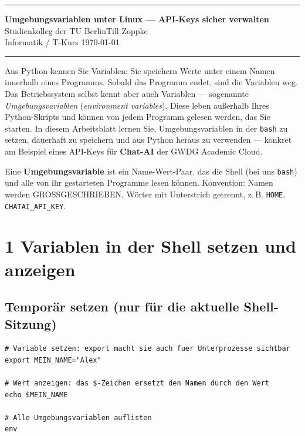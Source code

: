 \documentclass[ngerman,11pt]{article}
\begin{document}
\hrule
\begin{center}
{\large\bf Umgebungsvariablen unter Linux --- API-Keys sicher verwalten}\\[-0mm]
Studienkolleg der TU Berlin\hfill Till Zoppke\\
Informatik / T-Kurs \hfill \today\\[2mm]
\end{center}
\hrule
\bigskip

\noindent Aus Python kennen Sie Variablen: Sie speichern Werte unter einem Namen innerhalb eines Programms. Sobald das Programm endet, sind die Variablen weg. Das Betriebssystem selbst kennt aber auch Variablen --- sogenannte \emph{Umgebungsvariablen} (\emph{environment variables}). Diese leben außerhalb Ihres Python-Skripts und können von jedem Programm gelesen werden, das Sie starten. In diesem Arbeitsblatt lernen Sie, Umgebungsvariablen in der \texttt{bash} zu setzen, dauerhaft zu speichern und aus Python heraus zu verwenden --- konkret am Beispiel eines API-Keys für \textbf{Chat-AI} der GWDG Academic Cloud.

\begin{tcolorbox}[title=Definition: Umgebungsvariable]
Eine \textbf{Umgebungsvariable} ist ein Name-Wert-Paar, das die Shell (bei uns \texttt{bash}) und alle von ihr gestarteten Programme lesen können. Konvention: Namen werden \textsc{GROSSGESCHRIEBEN}, Wörter mit Unterstrich getrennt, z.\,B. \texttt{HOME}, \texttt{CHATAI\_API\_KEY}.
\end{tcolorbox}
\bigskip

\section*{1 Variablen in der Shell setzen und anzeigen}

\subsection*{Temporär setzen (nur für die aktuelle Shell-Sitzung)}

\begin{lstlisting}[style=bash,caption={Terminal}]
# Variable setzen: export macht sie auch fuer Unterprozesse sichtbar
export MEIN_NAME="Alex"

# Wert anzeigen: das $-Zeichen ersetzt den Namen durch den Wert
echo $MEIN_NAME

# Alle Umgebungsvariablen auflisten
env
\end{lstlisting}
\end{document}
